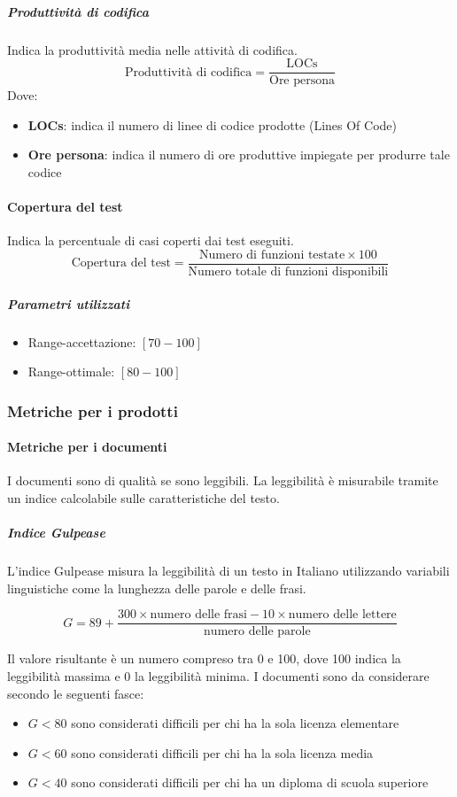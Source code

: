 \subparagraph{Produttività di codifica}
Indica la produttività media nelle attività di codifica.
$$
\text{Produttività di codifica} = \frac{\text{LOCs}}{\text{Ore persona}}
$$
Dove:
\begin{itemize}
\item \textbf{LOCs}: indica il numero di linee di codice prodotte
  (Lines Of Code)
\item \textbf{Ore persona}: indica il numero di ore produttive
  impiegate per produrre tale codice
\end{itemize}

\paragraph{Copertura del test}
Indica la percentuale di casi coperti dai test eseguiti.
$$
\text{Copertura del test} = \frac{\text{Numero di funzioni testate} \times 100}{\text{Numero totale
    di funzioni disponibili}}
$$

\subparagraph{Parametri utilizzati}
\begin{itemize}
\item Range-accettazione: $[70 - 100]$
\item Range-ottimale: $[80 - 100]$
\end{itemize}






\subsubsection{Metriche per i prodotti}

\paragraph{Metriche per i documenti}
I documenti sono di qualità se sono leggibili. La leggibilità è
misurabile tramite un indice calcolabile sulle caratteristiche del
testo.

\subparagraph{Indice Gulpease}
L'indice Gulpease misura la leggibilità di un testo in Italiano
utilizzando variabili linguistiche come la lunghezza delle parole e
delle frasi.

$$
G = 89 + \frac{300 \times \text{numero delle frasi} - 10 \times \text{numero delle lettere}}{\text{numero
    delle parole}}
$$

Il valore risultante è un numero compreso tra 0 e 100, dove 100 indica
la 
leggibilità massima e 0 la leggibilità minima. I documenti sono da
considerare secondo le seguenti fasce:
\begin{itemize}
\item $ G < 80 $ sono considerati difficili per chi ha la sola licenza
  elementare
\item $ G < 60 $ sono considerati difficili per chi ha la sola licenza
  media
\item $ G < 40 $ sono considerati difficili per chi ha un diploma di
  scuola  superiore
\end{itemize}

